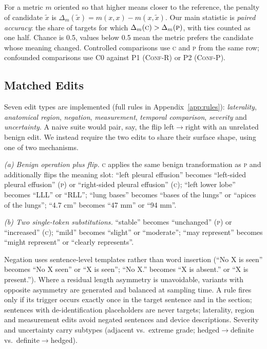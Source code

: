 \documentclass[11pt]{article}
\newcommand{\Pc}{\textsc{p}\xspace}
\newcommand{\Cc}{\textsc{c}\xspace}
\newcommand{\confr}{\textsc{Conf-R}\xspace}
\newcommand{\confp}{\textsc{Conf-P}\xspace}
\begin{document}
For a metric $m$ oriented so that higher means closer to the reference, the penalty of candidate $\tilde{x}$ is $\Delta_m(\tilde{x}) = m(x,x) - m(x,\tilde{x})$. Our main statistic is \emph{paired accuracy}: the share of targets for which $\Delta_m(\Cc) > \Delta_m(\Pc)$, with ties counted as one half. Chance is 0.5, values below 0.5 mean the metric prefers the candidate whose meaning changed. Controlled comparisons use \Cc and \Pc from the same row; confounded comparisons use C0 against P1 (\confr) or P2 (\confp).

\subsection{Matched Edits}

Seven edit types are implemented (full rules in Appendix~\ref{app:rules}): \emph{laterality}, \emph{anatomical region}, \emph{negation}, \emph{measurement}, \emph{temporal comparison}, \emph{severity} and \emph{uncertainty}. A naive suite would pair, say, the flip left$\to$right with an unrelated benign edit. We instead require the two edits to share their surface shape, using one of two mechanisms.

\emph{(a) Benign operation plus flip.} \Cc applies the same benign transformation as \Pc and additionally flips the meaning slot: ``left pleural effusion'' becomes ``left-sided pleural effusion'' (\Pc) or ``right-sided pleural effusion'' (\Cc); ``left lower lobe'' becomes ``LLL'' or ``RLL''; ``lung bases'' becomes ``bases of the lungs'' or ``apices of the lungs''; ``4.7 cm'' becomes ``47 mm'' or ``94 mm''.

\emph{(b) Two single-token substitutions.} ``stable'' becomes ``unchanged'' (\Pc) or ``increased'' (\Cc); ``mild'' becomes ``slight'' or ``moderate''; ``may represent'' becomes ``might represent'' or ``clearly represents''.

Negation uses sentence-level templates rather than word insertion (``No X is seen'' becomes ``No X seen'' or ``X is seen''; ``No X.'' becomes ``X is absent.'' or ``X is present.''). Where a residual length asymmetry is unavoidable, variants with opposite asymmetry are generated and balanced at sampling time.
A rule fires only if its trigger occurs exactly once in the target sentence and in the section; sentences with de-identification placeholders are never targets; laterality, region and measurement edits avoid negated sentences and device descriptions. Severity and uncertainty carry subtypes (adjacent vs.\ extreme grade; hedged$\to$definite vs.\ definite$\to$hedged).
\end{document}
